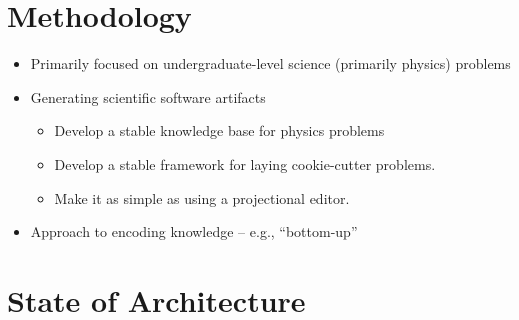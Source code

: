 \section{Methodology}

\begin{itemize}

      \item Primarily focused on undergraduate-level science (primarily physics)
            problems

      \item Generating scientific software artifacts
            \begin{itemize}
                  \item Develop a stable knowledge base for physics problems

                  \item Develop a stable framework for laying cookie-cutter
                        problems.

                  \item Make it as simple as using a projectional editor.

            \end{itemize}

      \item Approach to encoding knowledge -- e.g., ``bottom-up''

\end{itemize}

\section{State of Architecture}

